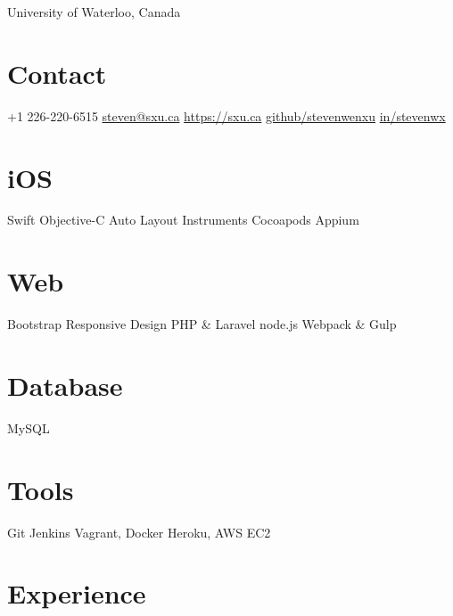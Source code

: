 \documentclass[]{friggeri-cv}
\begin{document}
       {University of Waterloo, Canada}


\begin{aside}
  \section{Contact}
    +1 226-220-6515
    \href{mailto:steven@sxu.ca}{steven@sxu.ca}
    \href{https://sxu.ca}{https://sxu.ca}
    \href{https://github.com/stevenwenxu}{github/stevenwenxu}
    \href{https://ca.linkedin.com/in/stevenwx}{in/stevenwx}
  \section{iOS}
    Swift
    Objective-C
    Auto Layout
    Instruments
    Cocoapods
    Appium
  \section{Web}
    Bootstrap
    Responsive Design
    PHP \& Laravel
    node.js
    Webpack \& Gulp
  \section{Database}
    MySQL
  \section{Tools}
    Git
    Jenkins
    Vagrant, Docker
    Heroku, AWS EC2
\end{aside}

\section{Experience}
\end{document}
